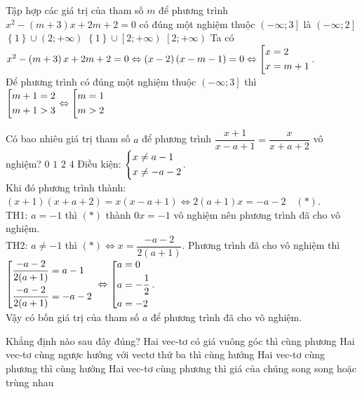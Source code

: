 \begin{ex}%
Tập hợp các giá trị của tham số $m$ để phương trình $x^2-\left(m+3\right)x+2m+2=0$ có đúng một nghiệm thuộc $\left(-\infty;3\right]$ là
\choice
{$\left(-\infty;2\right]$}
{\True $\left\{1\right\}\cup\left(2;+\infty\right)$}
{$\left\{1\right\}\cup\left[2;+\infty\right)$}
{$\left[2;+\infty\right)$}
\loigiai
{Ta có $x^2-\left(m+3\right)x+2m+2=0\Leftrightarrow \left(x-2\right)\left(x-m-1\right)=0\Leftrightarrow\left[\begin{aligned}&x=2\\&x=m+1\end{aligned}\right.$.\\Để phương trình có đúng một nghiệm thuộc $\left(-\infty;3\right]$ thì $\left[\begin{aligned}&m+1=2\\&m+1>3\end{aligned}\right.\Leftrightarrow\left[\begin{aligned}&m=1\\&m>2\end{aligned}\right.$}
\end{ex}

\begin{ex}%
Có bao nhiêu giá trị tham số $a$ để phương trình $\dfrac{x+1}{x-a+1}=\dfrac{x}{x+a+2}$ vô nghiệm?
\choice
{$0$}
{$1$}
{$2$}
{\True $4$}
\loigiai
{Điều kiện: $\left\{\begin{aligned}&x\neq a-1\\&x\neq -a-2\end{aligned}\right.$.\\
Khi đó phương trình thành: $(x+1)(x+a+2)=x(x-a+1)\Leftrightarrow 2(a+1)x=-a-2\quad (*)$.\\TH1: $a=-1$ thì $(*)$ thành $0x=-1$ vô nghiệm nên phương trình đã cho vô nghiệm.\\TH2: $a\neq -1$ thì $(*)\Leftrightarrow x=\dfrac{-a-2}{2(a+1)}$. Phương trình đã cho vô nghiệm thì $\left[\begin{aligned}&\dfrac{-a-2}{2(a+1)}=a-1\\&\dfrac{-a-2}{2(a+1)}=-a-2\end{aligned}\right.$ $\Leftrightarrow\left[\begin{aligned}&a=0\\&a=-\frac{1}{2}\\&a=-2\end{aligned}\right.$.\\Vậy có bốn giá trị của tham số $a$ để phương trình đã cho vô nghiệm.
}
\end{ex}

\begin{ex}%
Khẳng định nào sau đây đúng?
\choice
{Hai vec-tơ có giá vuông góc thì cùng phương}
{Hai vec-tơ cùng ngược hướng với vectơ thứ ba thì cùng hướng}
{Hai vec-tơ cùng phương thì cùng hướng}
{\True Hai vec-tơ cùng phương thì giá của chúng song song hoặc trùng nhau}
\end{ex}

